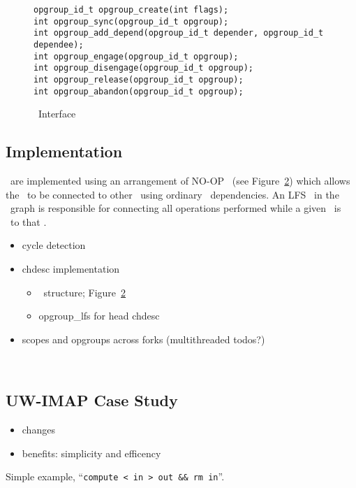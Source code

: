 \begin{figure}[htb]
\begin{small}
\texttt{opgroup\_id\_t opgroup\_create(int flags);}\\
\texttt{int opgroup\_sync(opgroup\_id\_t opgroup);}\\
\texttt{int opgroup\_add\_depend(opgroup\_id\_t depender, opgroup\_id\_t dependee);}\\
\texttt{int opgroup\_engage(opgroup\_id\_t opgroup);}\\
\texttt{int opgroup\_disengage(opgroup\_id\_t opgroup);}\\
\texttt{int opgroup\_release(opgroup\_id\_t opgroup);}\\
\texttt{int opgroup\_abandon(opgroup\_id\_t opgroup);}
\end{small}
\caption{\label{fig:opgroup-interface} \Opgroup\ Interface}
\end{figure}

\subsection{Implementation}
\label{sec:opgroup:implementation}


\Opgroups\ are implemented using an arrangement of NO-OP \chdescs\ (see
Figure~\ref{fig:opgroup-chdescs}) which allows the \opgroup\ to be connected to
other \opgroups\ using ordinary \chdesc\ dependencies. An LFS \module\ in the
\module\ graph is responsible for connecting all operations performed while a
given \opgroup\ is \engaged\ to that \opgroup.

\begin{itemize}
\item cycle detection
\item chdesc implementation
  \begin{itemize}
  \item \chdesc\ structure; Figure~\ref{fig:opgroup-chdescs}
  \item opgroup\_lfs for head chdesc
  \end{itemize}
\item scopes and opgroups across forks (multithreaded todos?)
\end{itemize}

\begin{figure}[htb]
\caption{\label{fig:opgroup-chdescs} \Opgroup\ \Chdescs}
\end{figure}

\subsection{UW-IMAP Case Study}
\label{sec:opgroup:uwimap}
\begin{itemize}
\item changes
\item benefits: simplicity and efficency
\end{itemize}

Simple example, ``\texttt{compute < in > out \&\& rm in}''.
